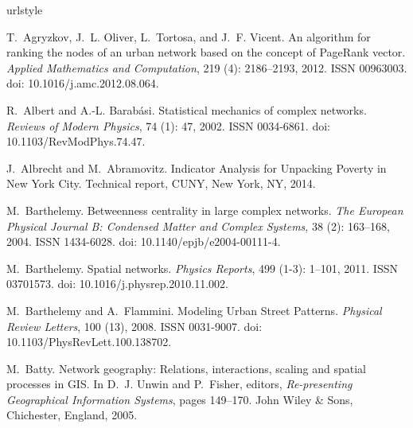 \documentclass[Afour,sageh,times]{sagej}
\begin{document}
\begin{thebibliography}{54}
	\providecommand{\natexlab}[1]{#1}
	\providecommand{\url}[1]{\texttt{#1}}
	\expandafter\ifx\csname urlstyle\endcsname\relax
	\providecommand{\doi}[1]{doi: #1}\else
	\providecommand{\doi}{doi: \begingroup \urlstyle{rm}\Url}\fi
	
	T.~Agryzkov, J.~L. Oliver, L.~Tortosa, and J.~F. Vicent.
	\newblock An algorithm for ranking the nodes of an urban network based on the
	concept of {PageRank} vector.
	\newblock \emph{Applied Mathematics and Computation}, 219
	(4): 2186--2193, 2012.
	\newblock ISSN 00963003.
	\newblock \doi{10.1016/j.amc.2012.08.064}.
	
	R.~Albert and A.-L. Barabási.
	\newblock Statistical mechanics of complex networks.
	\newblock \emph{Reviews of Modern Physics}, 74 (1): 47, 2002.
	\newblock ISSN 0034-6861.
	\newblock \doi{10.1103/RevModPhys.74.47}.
	
	J.~Albrecht and M.~Abramovitz.
	\newblock Indicator {Analysis} for {Unpacking} {Poverty} in {New} {York}
	{City}.
	\newblock Technical report, CUNY, New York, NY, 2014.
	
	M.~Barthelemy.
	\newblock Betweenness centrality in large complex networks.
	\newblock \emph{The European Physical Journal B: Condensed Matter and Complex
		Systems}, 38 (2): 163--168, 2004.
	\newblock ISSN 1434-6028.
	\newblock \doi{10.1140/epjb/e2004-00111-4}.
	
	M.~Barthelemy.
	\newblock Spatial networks.
	\newblock \emph{Physics Reports}, 499 (1-3): 1--101, 2011.
	\newblock ISSN 03701573.
	\newblock \doi{10.1016/j.physrep.2010.11.002}.
	
	M.~Barthelemy and A.~Flammini.
	\newblock Modeling {Urban} {Street} {Patterns}.
	\newblock \emph{Physical Review Letters}, 100 (13), 2008.
	\newblock ISSN 0031-9007.
	\newblock \doi{10.1103/PhysRevLett.100.138702}.
	
	M.~Batty.
	\newblock Network geography: {Relations}, interactions, scaling and spatial
	processes in {GIS}.
	\newblock In D.~J. Unwin and P.~Fisher, editors, \emph{Re-presenting
		{Geographical} {Information} {Systems}}, pages 149--170. John Wiley \& Sons,
	Chichester, England, 2005.
	

\end{thebibliography}
\end{document}
